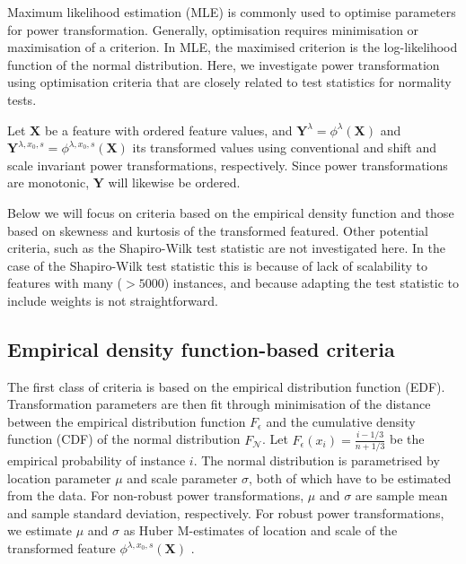 \documentclass[preprint,12pt,authoryear]{elsarticle}
\begin{document}
Maximum likelihood estimation (MLE) is commonly used to optimise
parameters for power transformation. Generally, optimisation requires
minimisation or maximisation of a criterion. In MLE, the maximised
criterion is the log-likelihood function of the normal distribution.
Here, we investigate power transformation using optimisation criteria
that are closely related to test statistics for normality tests.

Let \(\mathbf{X}\) be a feature with ordered feature values, and
\(\mathbf{Y}^\lambda =\phi^{\lambda} \left(\mathbf{X} \right)\) and
\(\mathbf{Y}^{\lambda, x_0, s} =\phi^{\lambda, x_0, s} \left(\mathbf{X} \right)\)
its transformed values using conventional and shift and scale invariant
power transformations, respectively. Since power transformations are
monotonic, \(\mathbf{Y}\) will likewise be ordered.

Below we will focus on criteria based on the empirical density function
and those based on skewness and kurtosis of the transformed featured.
Other potential criteria, such as the Shapiro-Wilk test statistic
\citep{Shapiro1965-zd} are not investigated here. In the case of the
Shapiro-Wilk test statistic this is because of lack of scalability to
features with many (\(> 5000\)) instances, and because adapting the test
statistic to include weights is not straightforward.

\subsection{Empirical density function-based
criteria}\label{empirical-density-function-based-criteria}

The first class of criteria is based on the empirical distribution
function (EDF). Transformation parameters are then fit through
minimisation of the distance between the empirical distribution function
\(F_{\epsilon}\) and the cumulative density function (CDF) of the normal
distribution \(F_{\mathcal{N}}\). Let
\(F_{\epsilon}\left(x_i \right) = \frac{i - 1/3}{n + 1/3}\) be the
empirical probability of instance \(i\). The normal distribution is
parametrised by location parameter \(\mu\) and scale parameter
\(\sigma\), both of which have to be estimated from the data. For
non-robust power transformations, \(\mu\) and \(\sigma\) are sample mean
and sample standard deviation, respectively. For robust power
transformations, we estimate \(\mu\) and \(\sigma\) as Huber M-estimates
of location and scale of the transformed feature
\(\phi^{\lambda, x_0, s} (\mathbf{X})\) \citep{Huber1981-su}.
\end{document}
